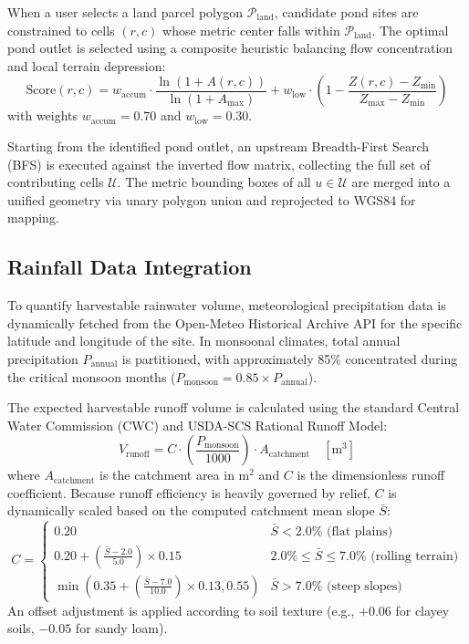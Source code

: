 \documentclass[manuscript,screen,review]{acmart}
\begin{document}
When a user selects a land parcel polygon $\mathcal{P}_{\text{land}}$, candidate pond sites are constrained to cells $(r, c)$ whose metric center falls within $\mathcal{P}_{\text{land}}$. The optimal pond outlet is selected using a composite heuristic balancing flow concentration and local terrain depression:
$$\text{Score}(r, c) = w_{\text{accum}} \cdot \frac{\ln(1 + A(r, c))}{\ln(1 + A_{\max})} + w_{\text{low}} \cdot \left(1 - \frac{Z(r, c) - Z_{\min}}{Z_{\max} - Z_{\min}}\right)$$
with weights $w_{\text{accum}} = 0.70$ and $w_{\text{low}} = 0.30$. 

Starting from the identified pond outlet, an upstream Breadth-First Search (BFS) is executed against the inverted flow matrix, collecting the full set of contributing cells $\mathcal{U}$. The metric bounding boxes of all $u \in \mathcal{U}$ are merged into a unified geometry via unary polygon union and reprojected to WGS84 for mapping.

\subsection{Rainfall Data Integration}
To quantify harvestable rainwater volume, meteorological precipitation data is dynamically fetched from the Open-Meteo Historical Archive API for the specific latitude and longitude of the site. In monsoonal climates, total annual precipitation $P_{\text{annual}}$ is partitioned, with approximately 85\% concentrated during the critical monsoon months ($P_{\text{monsoon}} = 0.85 \times P_{\text{annual}}$).

The expected harvestable runoff volume is calculated using the standard Central Water Commission (CWC) and USDA-SCS Rational Runoff Model:
$$V_{\text{runoff}} = C \cdot \left(\frac{P_{\text{monsoon}}}{1000}\right) \cdot A_{\text{catchment}} \quad [\text{m}^3]$$
where $A_{\text{catchment}}$ is the catchment area in $\text{m}^2$ and $C$ is the dimensionless runoff coefficient. Because runoff efficiency is heavily governed by relief, $C$ is dynamically scaled based on the computed catchment mean slope $\bar{S}$:
$$C = \begin{cases} 
0.20 & \bar{S} < 2.0\% \text{ (flat plains)} \\
0.20 + \left(\frac{\bar{S} - 2.0}{5.0}\right) \times 0.15 & 2.0\% \le \bar{S} \le 7.0\% \text{ (rolling terrain)} \\
\min\left(0.35 + \left(\frac{\bar{S} - 7.0}{10.0}\right) \times 0.13, 0.55\right) & \bar{S} > 7.0\% \text{ (steep slopes)}
\end{cases}$$
An offset adjustment is applied according to soil texture (e.g., $+0.06$ for clayey soils, $-0.05$ for sandy loam).
\end{document}
